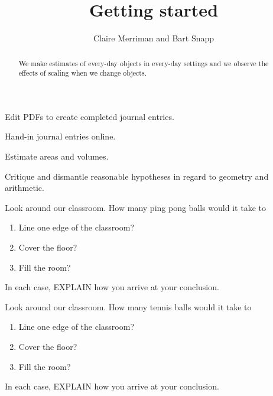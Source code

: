 \documentclass[handout,noauthor,nooutcomes,hints]{ximera}
\title{Getting started}
\author{Claire Merriman and Bart Snapp}
\begin{document}
\begin{abstract}
  We make estimates of every-day objects in every-day settings and we
  observe the effects of scaling when we change objects.
\end{abstract}
\maketitle



\begin{listOutcomes}
\item{Edit PDFs to create completed journal entries.}
\item{Hand-in journal entries online.}
\item{Estimate areas and volumes.}
\item{Critique and dismantle reasonable hypotheses in regard to geometry and arithmetic.}
\end{listOutcomes}

\mynewpage

\begin{question}
Look around our classroom. How many ping pong balls would it take to
\begin{enumerate}
\item Line one edge of the classroom?
\item Cover the floor?
\item Fill the room?
\end{enumerate}
In each case, EXPLAIN how you arrive at your conclusion.



\end{question}
\mynewpage

\begin{question}
Look around our classroom. How many tennis balls would it take to
\begin{enumerate}
\item Line one edge of the classroom?
 \item Cover the floor?
 \item Fill the room?
\end{enumerate}
In each case, EXPLAIN how you arrive at your conclusion.
\end{question}
\end{document}
